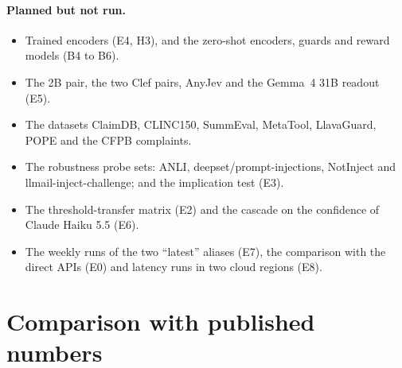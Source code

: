 \documentclass[11pt]{article}
\begin{document}
\paragraph{Planned but not run.}
\begin{itemize}
\setlength\itemsep{0pt}
\item Trained encoders (E4, H3), and the zero-shot encoders, guards and reward models (B4 to B6).
\item The 2B pair, the two Clef pairs, AnyJev and the Gemma~4 31B readout (E5).
\item The datasets ClaimDB, CLINC150, SummEval, MetaTool, LlavaGuard, POPE and the CFPB complaints.
\item The robustness probe sets: ANLI, deepset/prompt-injections, NotInject and llmail-inject-challenge; and the implication test (E3).
\item The threshold-transfer matrix (E2) and the cascade on the confidence of Claude Haiku 5.5 (E6).
\item The weekly runs of the two ``latest'' aliases (E7), the comparison with the direct APIs (E0) and latency runs in two cloud regions (E8).
\end{itemize}

\section{Comparison with published numbers}
\label{app:comparison}
\end{document}
